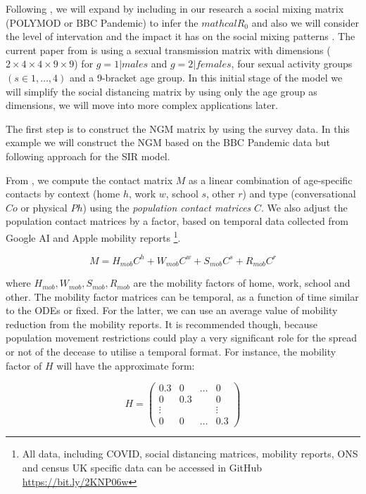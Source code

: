 \documentclass[12pt]{article}
\begin{document}
Following \cite{Fumanelli:2012, Baguelin:2013, Klepac2020}, we will expand \cite{Gareth:2013} by including in our research a social mixing matrix (POLYMOD or BBC Pandemic) to infer the $mathcal{R}_{0}$ and also we will consider the level of intervation and the impact it has on the social mixing patterns \cite{Kiesha:2017}. The current paper from \cite{Gareth:2013} is using a sexual transmission matrix with dimensions ($2 \times 4 \times 4 \times 9 \times 9$) for $g=1|males$ and $g=2|females$, four sexual activity groups $(s\in {1, \dots ,4})$ and a 9-bracket age group. In this initial stage of the model we will simplify the social distancing matrix by using only the age group as dimensions, we will move into more complex applications later.

The first step is to construct the NGM matrix \cite{Diekmann:2010} by using the survey data. In this example we will construct the NGM based on the BBC Pandemic data but following \cite{Fumanelli:2012} approach for the SIR model. 



From \cite{Klepac2020}, we compute the contact matrix $M$ as a linear combination of age-specific contacts by context (home $h$, work $w$, school $s$, other $r$) and type (conversational $Co$ or physical $Ph$) using the \textit{population contact matrices} $C$. We also adjust the population contact matrices by a factor, based on temporal data collected from Google AI and Apple mobility reports \footnote{All data, including COVID, social distancing matrices, mobility reports, ONS and census UK specific data can be accessed in GitHub  \url{https://bit.ly/2KNP06w}}.

\begin{equation}
M = H_{mob}C^{h} + W_{mob}C^{w} + S_{mob}C^{s} + R_{mob}C^{r}
\end{equation}

where $H_{mob}, W_{mob}, S_{mob}, R_{mob}$ are the mobility factors of home, work, school and other. The mobility factor matrices can be temporal, as a function of time similar to the ODEs or fixed. For the latter, we can use an average value of mobility reduction from the mobility reports. It is recommended though, because population movement restrictions could play a very significant role for the spread or not of the decease to utilise a temporal format. For instance, the mobility factor of $H$ will have the approximate form:

\begin{equation*}
H=
\begin{pmatrix}
0.3 & 0 & \dots & 0\\
0 & 0.3 &  & 0\\
\vdots &  &  & \vdots  \\
0 &  0 & \dots & 0.3
\end{pmatrix}
\end{equation*}
\end{document}
